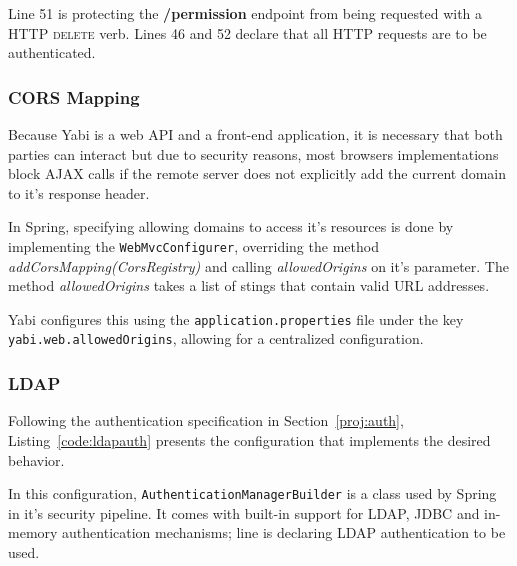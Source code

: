 Line 51 is protecting the \textbf{/permission} endpoint from being requested with a \gls{HTTP} \textsc{delete} verb.
Lines 46 and 52 declare that all \gls{HTTP} requests are to be authenticated.



\subsubsection{\gls{CORS} Mapping}

Because \gls{Yabi} is a web \gls{API} and a front-end application, it is necessary that both parties can interact but due to security reasons, most browsers implementations block \gls{AJAX} calls if the remote server does not explicitly add the current domain to it's response header.

In Spring, specifying allowing domains to access it's resources is done by implementing the \texttt{WebMvcConfigurer}, overriding the method \textit{addCorsMapping(CorsRegistry)} and calling \textit{allowedOrigins} on it's parameter. The method \textit{allowedOrigins} takes a list of stings that contain valid \gls{URL} addresses.

\gls{Yabi} configures this using the \texttt{application.properties} file under the key \texttt{yabi.web.allowedOrigins}, allowing for a centralized configuration.

\subsubsection{\gls{LDAP}}\label{impl:ldap}

Following the authentication specification in Section~\ref{proj:auth}, Listing~\ref{code:ldapauth} presents the configuration that implements the desired behavior.



In this configuration, \texttt{AuthenticationManagerBuilder} is a class used by Spring in it's security pipeline. It comes with built-in support for \gls{LDAP}, \gls{JDBC} and in-memory authentication mechanisms; line  is declaring \gls{LDAP} authentication to be used.

